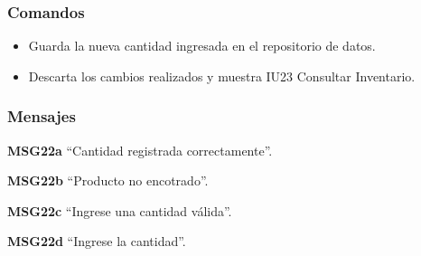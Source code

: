 \subsubsection{Comandos}
\begin{itemize}
	\item {} Guarda la nueva cantidad ingresada en el repositorio de datos.
	\item {} Descarta los cambios realizados y muestra IU23 Consultar Inventario.
\end{itemize}

\subsubsection{Mensajes}
\begin{Citemize}
	\item {\bf MSG22a} ``Cantidad registrada correctamente''.
	\item {\bf MSG22b} ``Producto no encotrado''.
	\item {\bf MSG22c} ``Ingrese una cantidad válida''.
	\item {\bf MSG22d} ``Ingrese la cantidad''.
\end{Citemize}